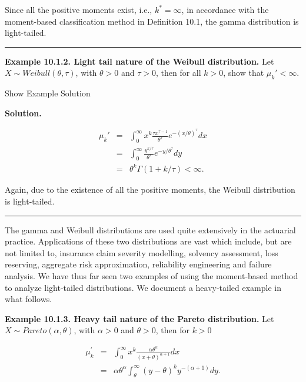 \documentclass[]{book}
\theoremstyle{definition}
\theoremstyle{definition}
\theoremstyle{definition}
\theoremstyle{remark}
\begin{document}
Since all the positive moments exist, i.e., \(k^{\ast}=\infty\), in
accordance with the moment-based classification method in Definition
10.1, the gamma distribution is light-tailed.

\begin{center}\rule{0.5\linewidth}{\linethickness}\end{center}

\textbf{Example 10.1.2. Light tail nature of the Weibull distribution.}
Let \(X\sim Weibull(\theta,\tau)\), with \(\theta>0\) and \(\tau>0\),
then for all \(k>0\), show that \(\mu_k' < \infty\).

Show Example Solution

\hypertarget{toggleExamplePortMgt.1.2}{}
\textbf{Solution.}

\begin{eqnarray*}
    \mu_k' &=& \int_0^{\infty} x^k \frac{\tau x^{\tau-1} }{\theta^{\tau}} e^{-(x/\theta)^{\tau}}dx \\
    &=& \int_0^{\infty}  \frac{ y^{k/\tau} }{\theta^{\tau}} e^{-y/\theta^{\tau}}dy \\
    &=& \theta^{k} \Gamma(1+k/\tau) < \infty.
\end{eqnarray*}

Again, due to the existence of all the positive moments, the Weibull
distribution is light-tailed.

\begin{center}\rule{0.5\linewidth}{\linethickness}\end{center}

The gamma and Weibull distributions are used quite extensively in the
actuarial practice. Applications of these two distributions are vast
which include, but are not limited to, insurance claim severity
modelling, solvency assessment, loss reserving, aggregate risk
approximation, reliability engineering and failure analysis. We have
thus far seen two examples of using the moment-based method to analyze
light-tailed distributions. We document a heavy-tailed example in what
follows.

\textbf{Example 10.1.3. Heavy tail nature of the Pareto distribution.}
Let \(X\sim Pareto(\alpha,\theta)\), with \(\alpha>0\) and \(\theta>0\),
then for \(k>0\)

\begin{eqnarray*}
    \mu_k^{'} &=& \int_0^{\infty} x^k \frac{\alpha \theta^{\alpha}}{(x+\theta)^{\alpha+1}} dx \\
    &=& \alpha \theta^{\alpha} \int_{\theta}^{\infty} (y-\theta)^k {y^{-(\alpha+1)}} dy.
\end{eqnarray*}
\end{document}
